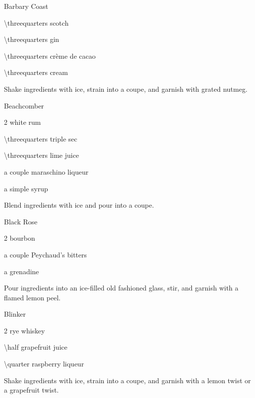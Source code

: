 \begin{Cocktail}{Barbary Coast}
	\begin{Ingredients}
	\item \SI{\threequarters}{\oz} scotch
	\item \SI{\threequarters}{\oz} gin
	\item \SI{\threequarters}{\oz} cr\`{e}me de cacao
	\item \SI{\threequarters}{\oz} cream
	\end{Ingredients}
	
	\begin{Instructions}
	Shake ingredients with ice, strain into a coupe, and garnish with grated nutmeg.
	\end{Instructions}
\end{Cocktail}

\begin{Cocktail}{Beachcomber}
	\begin{Ingredients}
	\item \SI{2}{\oz} white rum
	\item \SI{\threequarters}{\oz} triple sec
	\item \SI{\threequarters}{\oz} lime juice
	\item a couple \si{\dashes} maraschino liqueur
	\item a \si{\dash} simple syrup
	\end{Ingredients}
	
	\begin{Instructions}
	Blend ingredients with ice and pour into a coupe.
	\end{Instructions}
\end{Cocktail}

\begin{Cocktail}{Black Rose}
	\begin{Ingredients}
	\item \SI{2}{\oz} bourbon
	\item a couple \si{\dashes} Peychaud's bitters
	\item a \si{\dash} grenadine
	\end{Ingredients}
	
	\begin{Instructions}
	Pour ingredients into an ice-filled old fashioned glass, stir, and garnish with a flamed lemon peel.
	\end{Instructions}
\end{Cocktail}

\begin{Cocktail}{Blinker}
	\begin{Ingredients}
	\item \SI{2}{\oz} rye whiskey
	\item \SI{\half}{\oz} grapefruit juice
	\item \SI{\quarter}{\oz} raspberry liqueur
	\end{Ingredients}
	
	\begin{Instructions}
	Shake ingredients with ice, strain into a coupe, and garnish with a lemon twist or a grapefruit twist.
	\end{Instructions}
\end{Cocktail}

